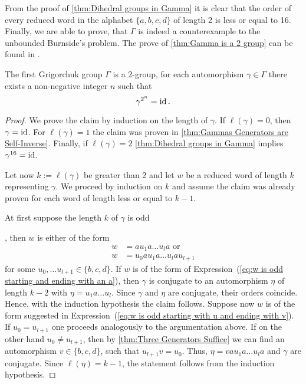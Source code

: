From the proof of \cref{thm:Dihedral groups in Gamma} it is clear that the order of every reduced word in the alphabet $\lbrace a,b,c,d \rbrace$ of length 2 is less or equal to 16. Finally, we are able to prove, that $\Gamma$ is indeed a counterexample to the unbounded Burnside's problem. The prove of \cref{thm:Gamma is a 2 group} can be found in \cite{de2000topics}.
\begin{thm}\label{thm:Gamma is a 2 group}
The first Grigorchuk group $\Gamma$ is a 2-group, \ie{} for each automorphism $\gamma\in\Gamma$ there exists a non-negative integer $n$ such that
\begin{equation*}
\gamma^{2^n}=\operatorname{id}.
\end{equation*}
\end{thm}
\begin{proof}
We prove the claim by induction on the length of $\gamma$. \hypertarget{thm:Base Case}{If} $\ell(\gamma)=0$, then $\gamma=\operatorname{id}$. For $\ell(\gamma)=1$ the claim was proven in \cref{thm:Gammas Generators are Self-Inverse}. Finally, if $\ell(\gamma)=2$ \cref{thm:Dihedral groups in Gamma} implies $\gamma^{16}=\operatorname{id}$.

Let now $k:=\ell(\gamma)$ be greater than 2 and let $w$ be a reduced word of length $k$ representing $\gamma$. We proceed by induction on $k$ and assume the claim was already proven for each word of length less or equal to $k-1$.

\hypertarget{thm:k is odd}{At first suppose the length $k$ of $\gamma$ is odd}, then $w$ is either of the form
\begin{align}
w&=au_1a\ldots u_la\text{ or}\label{eq:w is odd starting and ending with an a}\\
w&=u_0au_1a\ldots u_lau_{l+1}\label{eq:w is odd starting with u and ending with v}
\end{align}
for some $u_0,\ldots u_{l+1}\in\lbrace b,c,d\rbrace$. If $w$ is of the form of Expression~(\ref{eq:w is odd starting and ending with an a}), then $\gamma$ is conjugate to an automorphism $\eta$ of length $k-2$ with $\eta=u_1a\ldots u_l$. Since $\gamma$ and $\eta$ are conjugate, their orders coincide. Hence, with the induction hypothesis the claim follows. Suppose now $w$ is of the form suggested in Expression~(\ref{eq:w is odd starting with u and ending with v}). If $u_0=u_{l+1}$ one proceeds analogously to the argumentation above. If on the other hand $u_0\not=u_{l+1}$, then by \cref{thm:Three Generators Suffice} we can find an automorphism $v\in\lbrace b,c,d\rbrace$, such that $u_{l+1}v=u_0$. Thus, $\eta=vau_1a\ldots u_la$ and $\gamma$ are conjugate. Since $\ell(\eta)=k-1$, the statement follows from the induction hypothesis.


\end{proof}
